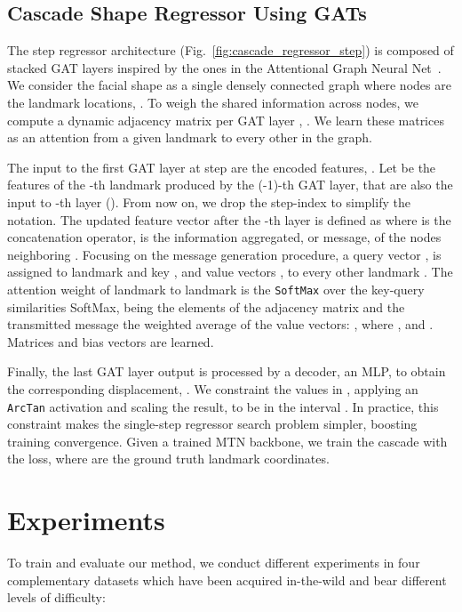 \documentclass{bmvc2k}
\begin{document}
\subsection{Cascade Shape Regressor Using GATs}
\label{sec:gnn_regressor}
The step regressor architecture (Fig.~\ref{fig:cascade_regressor_step}) is composed of stacked GAT layers inspired by the ones in the Attentional Graph Neural Net~\cite{Sarlin20superglue}. We consider the facial shape as a single densely connected graph where nodes are the landmark locations, . To weigh the shared information across nodes, we compute a dynamic adjacency matrix per GAT layer , .  We learn these matrices as an attention from a given landmark to every other in the graph.

The input to the first GAT layer at step  are the encoded features, . Let  be the features of the -th landmark produced by the (-1)-th GAT layer, that are also the input to -th layer (). From now on, we drop the step-index  to simplify the notation.
The updated feature vector after the -th layer is defined as 
where  is the concatenation operator,  is the information aggregated, or message, of the nodes neighboring . Focusing on the message generation procedure, a query vector , is assigned to landmark  and key , and value vectors , to every other landmark . The attention weight of landmark  to landmark  is the \texttt{SoftMax} over the key-query similarities  SoftMax, being  the elements of the adjacency matrix  and the transmitted message  the weighted average of the value vectors:
,
where
, 
 and 
. 
Matrices  and bias vectors  are learned.

Finally, the last GAT layer output  is processed by a decoder, an MLP, to obtain the corresponding displacement, . We constraint the values in , applying an \texttt{ArcTan} activation and scaling the result, to be in the interval . In practice, this constraint makes the single-step regressor search problem simpler, boosting training convergence. Given a trained MTN backbone, we train the cascade with the  loss, where  are the ground truth landmark coordinates.


\section{Experiments}
\label{sec:experiments}

To train and evaluate our method, we conduct different experiments in four complementary datasets which have been acquired in-the-wild and bear different levels of difficulty:
\end{document}
